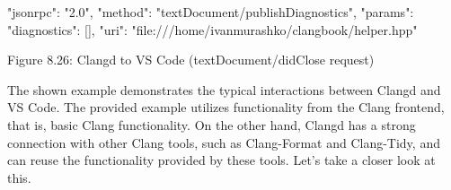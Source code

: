 \begin{shell}
{
  "jsonrpc": "2.0",
  "method": "textDocument/publishDiagnostics",
  "params": {
    "diagnostics": [],
    "uri": "file:///home/ivanmurashko/clangbook/helper.hpp"
  }
}
\end{shell}

\begin{center}
Figure 8.26: Clangd to VS Code (textDocument/didClose request)
\end{center}

The shown example demonstrates the typical interactions between Clangd and VS Code. The provided example utilizes functionality from the Clang frontend, that is, basic Clang functionality. On the other hand, Clangd has a strong connection with other Clang tools, such as Clang-Format and Clang-Tidy, and can reuse the functionality provided by these tools. Let's take a closer look at this.
























